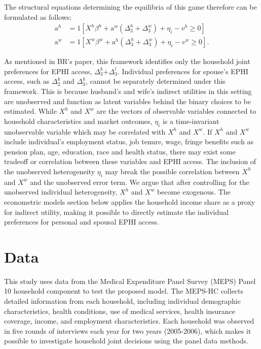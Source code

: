 \documentclass[legno,11pt]{article}
\begin{document}
   The
        structural equations determining the equilibria
        of this game therefore can be
        formulated as follows:
\begin{align}
\text{a}^{h}&= 1[X^{h}\beta^{h}+\text{a}^{w}(\Delta_{3}^{h}+\Delta_{3}^{w})+\eta_{i}-v^{h}\geq 0]\label{offer_1}\\
\text{a}^{w}&=
1[X^{w}\beta^{w}+\text{a}^{h}(\Delta_{3}^{h}+\Delta_{3}^{w})+\eta_{i}-v^{w}\geq
0].\label{offer_2}
\end{align}
\par
As mentioned in BR's paper, this framework identifies only
 the household joint preferences for EPHI access,
 $\Delta_{3}^{k}$+$\Delta_{3}^{l}$. Individual preferences
  for spouse's EPHI access, such as $\Delta_{2}^{k}$ and
  $\Delta_{3}^{k}$, cannot be separately determined under this framework.
  This is because husband's and wife's indirect utilities
  in this setting are unobserved and function as latent variables behind the binary choices to be estimated.
While $X^{h}$ and $X^{w}$ are the vectors of observable variables
connected to household characteristics and market outcomes,
$\eta_{i}$ is a time-invariant unobservable variable which may be
correlated with $X^{h}$ and $X^{w}$. If $X^{h}$ and $X^{w}$ include
individual's employment status, job tenure, wage, fringe benefits
such as pension plan, age, education, race and health status, there
may exist some tradeoff or correlation between these variables and
EPHI access. The inclusion of the unobserved heterogeneity
$\eta_{i}$ may break the possible correlation between $X^{h}$ and
$X^{w}$ and the unobserved error term. We argue that after
controlling for the unobserved individual heterogeneity, $X^{h}$ and
$X^{w}$ become exogenous. The econometric models section below
applies the household income share as a proxy for indirect utility,
making it possible to directly estimate the individual
   preferences for personal and spousal EPHI access.

\section{Data}\label{section3}

This study uses data from the Medical Expenditure Panel Survey
(MEPS) Panel 10 household component to test the proposed model. The
MEPS-HC collects detailed information from each household, including
individual demographic characteristics, health conditions, use of
medical services, health insurance coverage, income, and employment
characteristics. Each household was observed in five rounds of
interviews each year for two years (2005-2006), which makes it
possible to investigate household joint decisions using the panel
data methods.
\par
\end{document}
